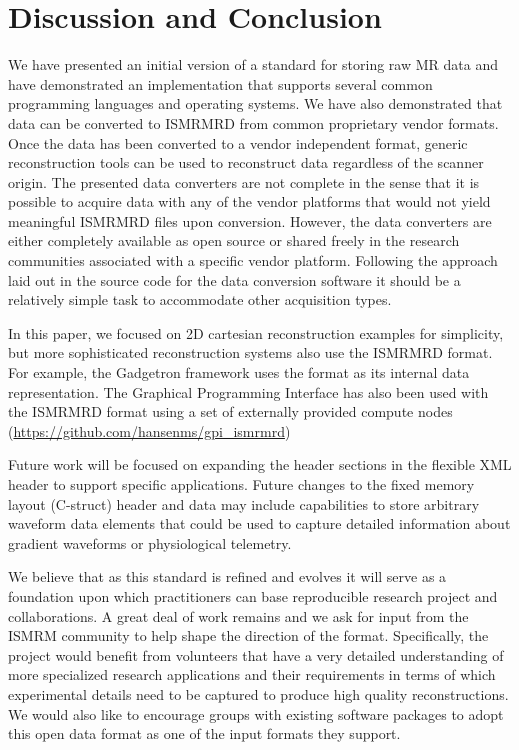 \documentclass[12pt]{article}
\begin{document}
\section*{Discussion and Conclusion}
We have presented an initial version of a standard for storing raw MR data and have demonstrated an implementation that supports several common programming languages and operating systems. We have also demonstrated that data can be converted to ISMRMRD from common proprietary vendor formats. Once the data has been converted to a vendor independent format, generic reconstruction tools can be used to reconstruct data regardless of the scanner origin. The presented data converters are not complete in the sense that it is possible to acquire data with any of the vendor platforms that would not yield meaningful ISMRMRD files upon conversion. However, the data converters are either completely available as open source or shared freely in the research communities associated with a specific vendor platform. Following the approach laid out in the source code for the data conversion software it should be a relatively simple task to accommodate other acquisition types. 

In this paper, we focused on 2D cartesian reconstruction examples for simplicity, but more sophisticated reconstruction systems also use the ISMRMRD format. For example, the Gadgetron \cite{Hansen:2013aa} framework uses the format as its internal data representation. The Graphical Programming Interface \cite{Zwart:2014aa} has also been used with the ISMRMRD format using a set of externally provided compute nodes (\url{https://github.com/hansenms/gpi_ismrmrd})

Future work will be focused on expanding the header sections in the flexible XML header to support specific applications.  Future changes to the fixed memory layout (C-struct) header and data may include capabilities to store arbitrary waveform data elements that could be used to capture detailed information about gradient waveforms or physiological telemetry. 

We believe that as this standard is refined and evolves it will serve as a foundation upon which practitioners can base reproducible research project and collaborations.  A great deal of work remains and we ask for input from the ISMRM community to help shape the direction of the format. Specifically, the project would benefit from volunteers that have a very detailed understanding of more specialized research applications and their requirements in terms of which experimental details need to be captured to produce high quality reconstructions. We would also like to encourage groups with existing software packages to adopt this open data format as one of the input formats they support. 
\end{document}
